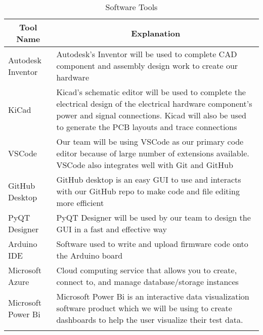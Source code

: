 \documentclass[12pt]{article}
\begin{document}
	\begin{longtable}{|p{6cm}|p{10cm}|}
		\hline
		\multicolumn{1}{|c|}{\textbf{Tool Name}} & \multicolumn{1}{c|}{\textbf{Explanation}} 
		\\ \hline
		Autodesk Inventor
		&  Autodesk's Inventor will be used to complete CAD component and assembly design work to create our hardware  
		\newline                              
		\\ \hline
		KiCad
		& Kicad's schematic editor will be used to complete the electrical design of the electrical hardware component's power and signal connections. Kicad will also be used to generate the PCB layouts and trace connections
		\newline                              
		\\ \hline
		VSCode
		&  Our team will be using VSCode as our primary code editor because of large number of extensions available. VSCode also integrates well with Git and GitHub
		\newline                              
		\\ \hline
		GitHub Desktop
		&  GitHub desktop is an easy GUI to use and interacts with our GitHub repo to make code and file editing more efficient
		\newline                              
		\\ \hline
		PyQT Designer
		&  PyQT Designer will be used by our team to design the GUI in a fast and effective way
		\newline                     
		\\ \hline
		Arduino IDE
		&  Software used to write and upload firmware code onto the Arduino board
		\newline                     
		\\ \hline
		Microsoft Azure
		&  Cloud computing service that allows you to create, connect to, and manage database/storage instances
		\newline                     
		\\ \hline
		Microsoft Power Bi
		&  Microsoft Power Bi is an interactive data visualization software product which we will be using to create dashboards to help the user visualize their test data.
		\newline                              
		\\ \hline
		\caption{Software Tools}
	\end{longtable}
\end{document}
